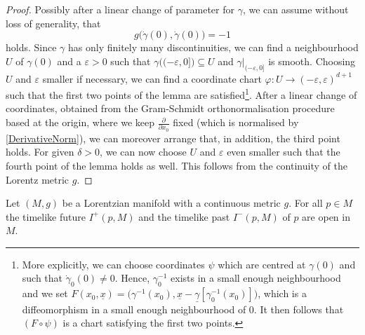 \documentclass[reqno]{article}
\newcommand{\ux}{\underline{x}}
\begin{document}
\begin{proof}
Possibly after a linear change of parameter for $\gamma$, we can assume without loss of generality, that
\begin{equation}
\label{DerivativeNorm}
g\big(\dot{\gamma}(0),\dot{\gamma}(0)\big) = -1
\end{equation}
holds. Since $\gamma$ has only finitely many discontinuities, we can find a neighbourhood $U$ of $\gamma(0)$ and a $\varepsilon >0$ such that $\gamma \big((-\varepsilon, 0]\big) \subseteq U$ and $\gamma\big|_{(-\varepsilon,0]}$ is smooth. Choosing $U$ and $\varepsilon$ smaller if necessary, we can find a coordinate chart $\varphi : U \to  (-\varepsilon , \varepsilon)^{d+1}$ such that the first two points of the lemma are satisfied\footnote{More explicitly, we can choose coordinates $\psi$ which are centred at $\gamma(0)$ and such that $\dot{\gamma}_0(0) \neq 0$. Hence, $\gamma^{-1}_0$ exists in a small enough neighbourhood and we set $F(x_0, \ux) = \big(\gamma^{-1}(x_0), \ux - \underline{\gamma}[\gamma_0^{-1}(x_0)]\big)$, which is a diffeomorphism in a small enough neighbourhood of $0$. It then follows that $(F\circ \psi)$ is a chart satisfying the first two points.}.
After a linear change of coordinates, obtained from the Gram-Schmidt orthonormalisation procedure based at the origin, where we keep $\frac{\partial}{\partial x_0}$ fixed (which is normalised by \eqref{DerivativeNorm}), we can moreover arrange that, in addition, the third point holds.  For given $\delta >0$, we can now choose $U$ and $\varepsilon$ even smaller such that the fourth point of the lemma holds as well. This follows from the continuity of the Lorentz metric $g$.
\end{proof}


\begin{proposition}\label{schwprop:FutureOpen}
\label{FutureOpen}
Let $(M,g)$ be a Lorentzian manifold with a continuous metric $g$. For all $p \in M$ the timelike future $I^+(p,M)$ and the timelike past $I^-(p,M)$ of $p$ are open in $M$.
\end{proposition}
\end{document}
